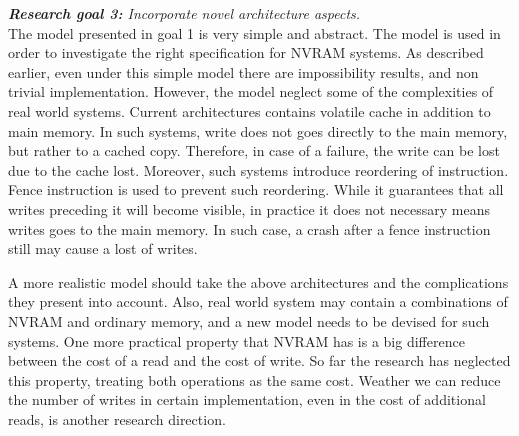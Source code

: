 \documentclass[11pt]{article}
\begin{document}
\noindent \emph{{\bf Research goal 3:} Incorporate novel architecture aspects.}\\
The model presented in goal 1 is very simple and abstract. The model is used in order to investigate the right specification for NVRAM systems. As described earlier, even under this simple model there are impossibility results, and non trivial implementation. However, the model neglect some of the complexities of real world systems. Current architectures contains volatile cache in addition to main memory. In such systems, write does not goes directly to the main memory, but rather to a cached copy. Therefore, in case of a failure, the write can be lost due to the cache lost. Moreover, such systems introduce reordering of instruction. Fence instruction is used to prevent such reordering. While it guarantees that all writes preceding it will become visible, in practice it does not necessary means writes goes to the main memory. In such case, a crash after a fence instruction still may cause a lost of writes.

A more realistic model should take the above architectures and the complications they present into account. Also, real world system may contain a combinations of NVRAM and ordinary memory, and a new model needs to be devised for such systems. One more practical property that NVRAM has is a big difference between the cost of a read and the cost of write. So far the research has neglected this property, treating both operations as the same cost. Weather we can reduce the number of writes in certain implementation, even in the cost of additional reads, is another research direction.
\end{document}

